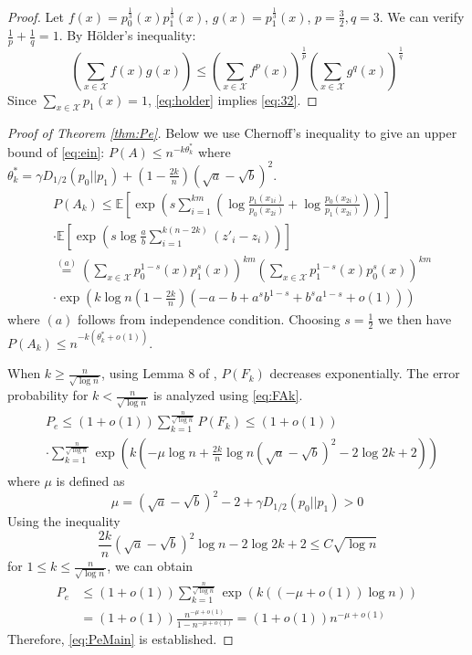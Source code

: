 \documentclass[conference,letterpaper]{IEEEtran}
\begin{document}
\begin{proof}
	Let $f(x)=p^{\frac{1}{3}}_0(x)p^{\frac{1}{3}}_1(x)$, $g(x) = p^{\frac{1}{3}}_1(x)$,
	$p=\frac{3}{2}, q=3$. We can verify $\frac{1}{p} + \frac{1}{q}=1$.
	By Hölder's inequality:
	\begin{equation}\label{eq:holder}
		(\sum_{x\in\mathcal{X}}f(x)g(x))\leq (\sum_{x\in\mathcal{X}} f^p(x))^{\frac{1}{p}}
		(\sum_{x\in\mathcal{X}} g^q(x))^{\frac{1}{q}}
	\end{equation}
	Since $\sum_{x\in\mathcal{X}} p_1(x)=1$, \eqref{eq:holder} implies
	\eqref{eq:32}.
\end{proof}
\begin{proof}[Proof of Theorem \ref{thm:Pe}]
Below we use Chernoff's inequality to give an upper bound of \eqref{eq:ein}:
$P(A) \leq n^{-k\theta^*_k}$ where $\theta^*_k=\gamma D_{1/2}(p_0||p_1)+(1-\frac{2k}{n})(\sqrt{a}-\sqrt{b})^2$.
\begin{align*}
&P(A_k) \leq \mathbb{E}
\left[\exp \left( s\sum_{i=1}^{km}
\left( \log \frac{p_1(x_{1i})}{p_0(x_{2i})}
+ \log \frac{p_0(x_{2i})}{p_1(x_{2i})} \right)
\right)\right]\\
& \cdot \mathbb{E}
\left[\exp\left(s\log \frac{a}{b}\sum_{i=1}^{k(n-2k)} (z'_i - z_i )\right)
\right] \\
& \stackrel{(a)}{=} (\sum_{x\in \mathcal{X}} p_0^{1-s}(x)p_1^{s}(x))^{km} (\sum_{x\in \mathcal{X}} p_1^{1-s}(x)p_0^{s}(x))^{km}\\
&   \cdot \exp(k\log n (1-\frac{2k}{n})(-a-b+a^sb^{1-s}+b^sa^{1-s} +o(1)) )
\end{align*}
where $(a)$ follows from independence condition. Choosing $s=\frac{1}{2}$ we then have 
$P(A_k) \leq  n^{-k(\theta^*_k+o(1))}$.

When $k \geq \frac{n}{\sqrt{\log n}}$, using Lemma 8 of \cite{feng2021},
$P(F_k)$ decreases exponentially. The error probability for $k < \frac{n}{\sqrt{\log n}}$
is analyzed using \eqref{eq:FAk}.
\begin{align*}
&P_e \leq (1+o(1))\sum_{k=1}^{\frac{n}{\sqrt{\log n}}} P(F_k) \leq (1+o(1))\\
& \cdot \sum_{k=1}^{\frac{n}{\sqrt{\log n}}} \exp(k(-\mu \log n + \frac{2k}{n} \log n(\sqrt{a} - \sqrt{b})^2 - 2\log 2k + 2))
\end{align*}
where $\mu$ is defined as
\begin{equation}\label{eq:mu_def}
	\mu = (\sqrt{a} - \sqrt{b})^2-2 + \gamma D_{1/2}(p_0||p_1) > 0	
\end{equation}
Using the inequality
$$
\frac{2k}{n}(\sqrt{a} - \sqrt{b})^2\log n -2\log2k+2\leq  C\sqrt{\log n}
$$
for $1\leq k \leq \frac{n}{\sqrt{\log n}}$, we can obtain
\begin{align*}
P_e &\leq(1+o(1)) \sum_{k=1}^{\frac{n}{\sqrt{\log n}}} \exp(k((-\mu + o(1)) \log n )) \\
& =(1+o(1)) \frac{n^{-\mu + o(1)}}{1-n^{-\mu + o(1)}} = (1+o(1))n^{-\mu + o(1)}
\end{align*}
Therefore, \eqref{eq:PeMain} is established.


\end{proof}
\end{document}

